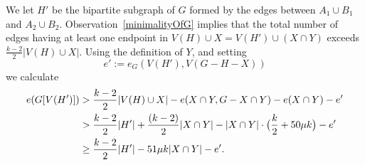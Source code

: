 \documentclass[12pt]{article}
\begin{document}
We let $H'$ be the bipartite subgraph of $G$ formed by the edges between $A_1 \cup B_1$
and $A_2 \cup B_2$.  
Observation~\ref{minimalityOfG} implies that 
the total number of edges having at least one endpoint in $V(H)\cup X=V(H')\cup (X\cap Y)$  exceeds $\frac{k-2}2 |V(H)\cup X|$. 
Using the definition of $Y$, 
and setting $$e':=e_G(V(H'),V(G-H-X))$$ 
we calculate
 \begin{align}
 e(G[V(H')])\notag  & >  \frac{k-2}2 |V(H)\cup X|  - e(X\cap Y, G-X\cap Y) - e(X\cap Y) -e'\notag \\
 &>  \frac{k-2}2 |H'| +  \frac{(k-2)}2 |X\cap Y|- |X\cap Y|\cdot \big (\frac k2+50\mu k \big ) -e' \notag \\
 &\ge
 \frac{k-2}2 |H'| - 51\mu k |X\cap Y| -e'.\label{pony}
   \end{align}
   
\end{document}
